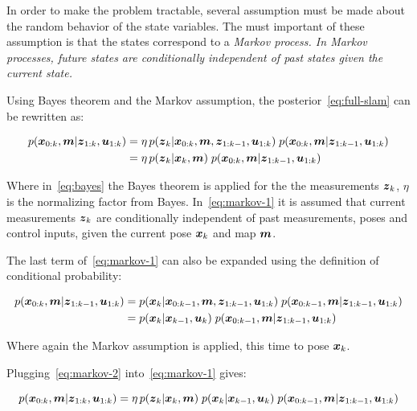 
In order to make the problem tractable, several assumption must be made about the random behavior of the state variables. The must important of these assumption is that the states correspond to a \it{Markov process}. In Markov processes, future states are conditionally independent of past states given the current state.

Using Bayes theorem and the Markov assumption, the posterior~\eqref{eq:full-slam} can be rewritten as:

\begin{align}
p(\boldsymbol{x}_{0:k},\boldsymbol{m}|\boldsymbol{z}_{1:k},\boldsymbol{u}_{1:k}) &= 
\eta\,p(\boldsymbol{z}_{k}|\boldsymbol{x}_{0:k},\boldsymbol{m},\boldsymbol{z}_{1:k-1},\boldsymbol{u}_{1:k})\; p(\boldsymbol{x}_{0:k},\boldsymbol{m}|\boldsymbol{z}_{1:k-1},\boldsymbol{u}_{1:k})
\label{eq:bayes}\\
&= \eta\,p(\boldsymbol{z}_{k}|\boldsymbol{x}_{k},\boldsymbol{m})\; p(\boldsymbol{x}_{0:k},\boldsymbol{m}|\boldsymbol{z}_{1:k-1},\boldsymbol{u}_{1:k})\label{eq:markov-1}
\end{align}

Where in~\eqref{eq:bayes} the Bayes theorem is applied for the the measurements $\boldsymbol{z}_k$, $\eta$ is the normalizing factor from Bayes. In~\eqref{eq:markov-1} it is assumed that current measurements $\boldsymbol{z}_k$ are conditionally independent of past measurements, poses and control inputs, given the current pose $\boldsymbol{x}_k$ and map $\boldsymbol{m}$.

The last term of~\eqref{eq:markov-1} can also be expanded using the definition of conditional probability:

\begin{align}
p(\boldsymbol{x}_{0:k},\boldsymbol{m}|\boldsymbol{z}_{1:k-1},\boldsymbol{u}_{1:k}) &=
p(\boldsymbol{x}_{k}|\boldsymbol{x}_{0:k-1},\boldsymbol{m},\boldsymbol{z}_{1:k-1},\boldsymbol{u}_{1:k})\; p(\boldsymbol{x}_{0:k-1},\boldsymbol{m}|\boldsymbol{z}_{1:k-1},\boldsymbol{u}_{1:k})\\
&= p(\boldsymbol{x}_{k}|\boldsymbol{x}_{k-1},\boldsymbol{u}_{k})\; p(\boldsymbol{x}_{0:k-1},\boldsymbol{m}|\boldsymbol{z}_{1:k-1},\boldsymbol{u}_{1:k}) \label{eq:markov-2}
\end{align}

Where again the Markov assumption is applied, this time to pose $\boldsymbol{x}_k$. 

Plugging~\eqref{eq:markov-2} into~\eqref{eq:markov-1} gives:

\begin{equation}
p(\boldsymbol{x}_{0:k},\boldsymbol{m}|\boldsymbol{z}_{1:k},\boldsymbol{u}_{1:k}) = 
\eta\,p(\boldsymbol{z}_{k}|\boldsymbol{x}_{k},\boldsymbol{m})\;
p(\boldsymbol{x}_{k}|\boldsymbol{x}_{k-1},\boldsymbol{u}_{k})\; p(\boldsymbol{x}_{0:k-1},\boldsymbol{m}|\boldsymbol{z}_{1:k-1},\boldsymbol{u}_{1:k})
\label{eq:recursive}
\end{equation}

